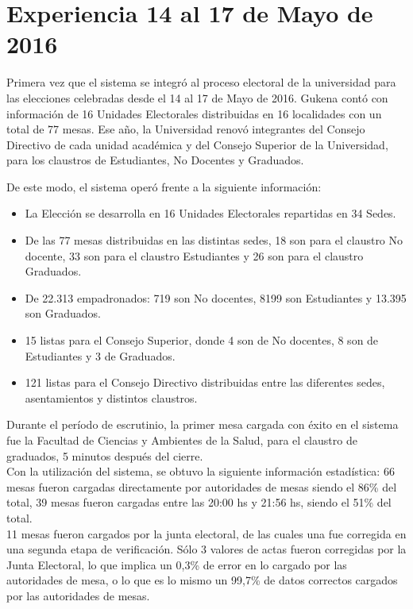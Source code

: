 \section{Experiencia 14 al 17 de Mayo de 2016}
\label{exp2016}
Primera vez que el sistema se integró al proceso electoral de la universidad para las elecciones celebradas desde el 14 al 17 de Mayo de 2016. Gukena contó con información de 16 Unidades Electorales distribuidas en 16 localidades con un total de 77 mesas. 
Ese año, la Universidad renovó integrantes del Consejo Directivo de cada unidad académica y del Consejo Superior de la Universidad, para los claustros de Estudiantes, No Docentes y Graduados. 

De este modo, el sistema operó frente a la siguiente información:
\begin{itemize}
    \item La Elección se desarrolla en 16 Unidades Electorales repartidas en 34 Sedes.
    \item De las 77 mesas distribuidas en las distintas sedes, 18 son para el claustro No docente, 33 son para el claustro Estudiantes y 26 son para el claustro Graduados.
    \item De 22.313 empadronados: 719 son No docentes, 8199 son Estudiantes y 13.395 son Graduados. 
    \item 15 listas para el Consejo Superior, donde 4 son de No docentes, 8 son de Estudiantes y 3 de Graduados.
    \item 121 listas para el Consejo Directivo distribuidas entre las diferentes sedes, asentamientos y distintos claustros.
\end{itemize}

Durante el período de escrutinio, la primer mesa cargada con éxito en el sistema fue la Facultad de Ciencias y Ambientes de la Salud, para el claustro de graduados, 5 minutos después del cierre.\\ 
Con la utilización del sistema, se obtuvo la siguiente información estadística:
66 mesas fueron cargadas directamente por autoridades de mesas siendo el 86\% del total, 39 mesas fueron cargadas entre las 20:00 hs y 21:56 hs, siendo el 51\% del total.\\
11 mesas fueron cargados por la junta electoral, de las cuales una fue corregida en una segunda etapa de verificación.
Sólo 3 valores de actas fueron corregidas por la Junta Electoral, lo que implica un 0,3\% de error en lo cargado por las autoridades de mesa, o lo que es lo mismo un 99,7\% de datos correctos cargados por las autoridades de mesas.

